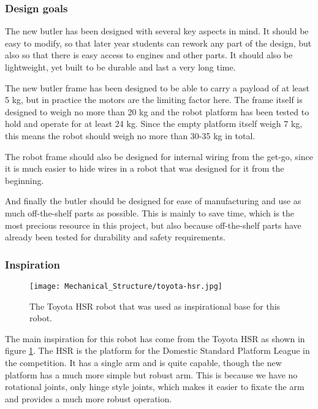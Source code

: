 \subsubsection{Design goals}

The new butler has been designed with several key aspects in mind. It should be easy to modify, so that later year students can rework any part of the design, but also so that there is easy access to engines and other parts. It should also be lightweight, yet built to be durable and last a very long time.

The new butler frame has been designed to be able to carry a payload of at least 5 kg, but in practice the motors are the limiting factor here. The frame itself is designed to weigh no more than 20 kg and the robot platform has been tested to hold and operate for at least 24 kg. Since the empty platform itself weigh 7 kg, this means the robot should weigh no more than 30-35 kg in total.

The robot frame should also be designed for internal wiring from the get-go, since it is much easier to hide wires in a robot that was designed for it from the beginning.

And finally the butler should be designed for ease of manufacturing and use as much off-the-shelf parts as possible. This is mainly to save time, which is the most precious resource in this project, but also because off-the-shelf parts have already been tested for durability and safety requirements.

\subsubsection{Inspiration}

\begin{figure}[!ht]
    \centering
    \texttt{[image: Mechanical\_Structure/toyota-hsr.jpg]}
    \caption{The Toyota HSR robot that was used as inspirational base for this robot.}
    \label{fig:toyota_hsr}
\end{figure}

The main inspiration for this robot has come from the Toyota HSR as shown in figure \ref{fig:toyota_hsr}. The HSR is the platform for the Domestic Standard Platform League in the competition. It has a single arm and is quite capable, though the new platform has a much more simple but robust arm. This is because we have no rotational joints, only hinge style joints, which makes it easier to fixate the arm and provides a much more robust operation.


